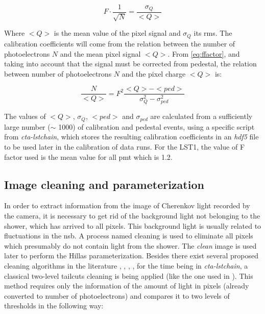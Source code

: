 \documentclass[main.tex]{subfiles}
\begin{document}
\begin{equation}
  F \cdot \frac{1}{\sqrt{N}} = \frac{\sigma_{Q}}{<Q>}
  \label{eq:ffactor}
\end{equation} 

Where $<Q>$ is the mean value of the pixel signal and $\sigma_{Q}$ its \gls{rms}. The calibration coefficients will come from the relation between the number of photoelectrons $N$ and the mean pixel signal $<Q>$. From \ref{eq:ffactor}, and taking into account that the signal must be corrected from pedestal, the relation between number of photoelectrons $N$ and the pixel charge $<Q>$ is:

\begin{equation}
  \frac{N}{<Q>} = F^{2}\frac{<Q> - <ped>}{\sigma_{Q}^{2} - \sigma_{ped}^{2}}
\end{equation}

The values of $<Q>$, $\sigma_{Q}$, $<ped>$ and $\sigma_{ped}$ are calculated from a sufficiently large number ($\sim$ 1000) of calibration and pedestal events, using a specific script from \textit{cta-lstchain}, which stores the resulting calibration coefficients in an \textit{hdf5} file to be used later in the calibration of data runs. For the LST1, the value of F factor used is the mean value for all \gls{pmt} which is 1.2.

\subsection{Image cleaning and parameterization} \label{sec:cleanpars}

In order to extract information from the image of Cherenkov light recorded by the camera, it is necessary to get rid of the background light not belonging to the shower, which has arrived to all pixels. This background light is usually related to fluctuations in the \gls{nsb}. A process named cleaning is used to eliminate all pixels which presumably do not contain light from the shower. The \textit{clean} image is used later to perform the Hillas parameterization. Besides there exist several proposed cleaning algorithms in the literature \cite{2019cleaningCNN}, \cite{2013neighborcleaning}, \cite{2005Cleaningwithtimeinfo}, \cite{2001waveletcleaning}, for the time being in \textit{cta-lstchain}, a classical two-level tailcuts cleaning is being applied (like the one used in \cite{1997HEGRAperformance}). This method requires only the information of the amount of light in pixels (already converted to number of photoelectrons) and compares it to two levels of thresholds in the following way: \\
\end{document}
